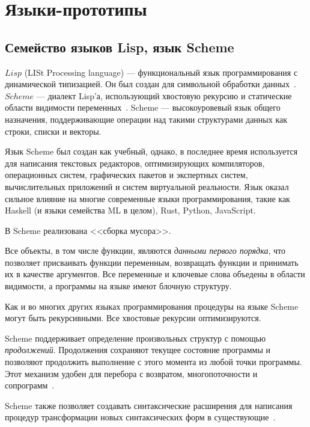 \section{Языки-прототипы}
    \subsection{Семейство языков Lisp, язык Scheme}
        $Lisp$ (LISt Processing language) --- функциональный язык программирования с динамической типизацией. 
        Он был создан для символьной обработки данных~\cite{p_c_lisp}.
        $Scheme$ --- диалект Lisp'а, использующий хвостовую рекурсию и статические области видимости переменных~\cite{scheme_doc}.
        Scheme --- высокоуровевый язык общего назначения, поддерживающие операции над такими структурами данных как строки, списки и векторы.

        Язык Scheme был создан как учебный, однако, в последнее время используется для написания текстовых редакторов, оптимизирующих компиляторов, операционных систем, графических пакетов и экспертных систем, вычислительных приложений и систем виртуальной реальности.
        Язык оказал сильное влияние на многие современные языки программирования, такие как Haskell (и языки семейства ML в целом), Rust, Python, JavaScript.

        В Scheme реализована <<сборка мусора>>.
        
        Все объекты, в том числе функции, являются \textit{данными первого порядка}, что позволяет присваивать функции переменным, возвращать функции и принимать их в качестве аргументов.
        Все переменные и ключевые слова объедены в области видимости, а программы на языке имеют блочную структуру.
        
        Как и во многих других языках программирования процедуры на языке Scheme могут быть рекурсивными.
        Все хвостовые рекурсии оптимизируются.

        Scheme поддерживает определение произвольных структур с помощью \textit{продолжений}.
        Продолжения сохраняют текущее состояние программы и позволяют продолжить выполнение с этого момента из любой точки программы.
        Этот механизм удобен для перебора с возвратом, многопоточности и сопрограмм~\cite{scheme_pl}.

        Scheme также позволяет создавать синтаксические расширения для написания процедур трансформации новых синтаксических форм в существующие~\cite{scheme_pl}.

